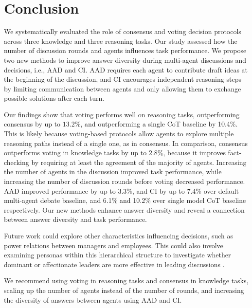 \section{Conclusion}

We systematically evaluated the role of consensus and voting decision protocols across three knowledge and three reasoning tasks.
Our study assessed how the number of discussion rounds and agents influences task performance.
We propose two new methods to improve answer diversity during multi-agent discussions and decisions, i.e., \acf{AAD} and \acf{CI}. 
\ac{AAD} requires each agent to contribute draft ideas at the beginning of the discussion, and \ac{CI} encourages independent reasoning steps by limiting communication between agents and only allowing them to exchange possible solutions after each turn.

Our findings show that voting performs well on reasoning tasks, outperforming consensus by up to $13.2\%$, and outperforming a single \ac{CoT} baseline by 10.4\%.
This is likely because voting-based protocols allow agents to explore multiple reasoning paths instead of a single one, as in consensus.
In comparison, consensus outperforms voting in knowledge tasks by up to $2.8\%$, because it improves fact-checking by requiring at least the agreement of the majority of agents.
Increasing the number of agents in the discussion improved task performance, while increasing the number of discussion rounds before voting decreased performance.
\ac{AAD} improved performance by up to $3.3\%$, and \ac{CI} by up to $7.4\%$ over default multi-agent debate baseline, and 6.1\% and 10.2\% over single model \ac{CoT} baseline respectively.
Our new methods enhance answer diversity and reveal a connection between answer diversity and task performance.

Future work could explore other characteristics influencing decisions, such as power relations between managers and employees. 
This could also involve examining personas within this hierarchical structure to investigate whether dominant or affectionate leaders are more effective in leading discussions \citep{AMES2009111}.


We recommend using voting in reasoning tasks and consensus in knowledge tasks, scaling up the number of agents instead of the number of rounds, and increasing the diversity of answers between agents using \ac{AAD} and \ac{CI}.

